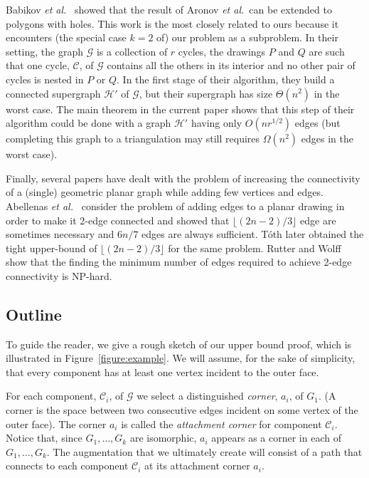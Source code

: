\documentclass[11pt]{patmorin}
\newcommand{\etal}{\emph{et al.}}
\begin{document}
Babikov \etal\ \cite{babikov.souvaine.ea:constructing} showed that the result of Aronov \etal\ can be extended to polygons with holes. This work is the most closely related to ours because it encounters (the special case $k=2$ of) our problem as a subproblem. In their setting, the graph $\mathcal G$ is a collection of $r$ cycles, the drawings $P$ and $Q$ are such that one cycle, $\mathcal C$, of $\mathcal G$ contains all the others in its interior and no other pair of cycles is nested in $P$ or $Q$. In the first stage of their algorithm, they build a connected supergraph $\mathcal{H}'$ of $\mathcal{G}$, but their supergraph has size $\Theta(n^2)$ in the worst case.  The main theorem in the current paper shows that this step of their algorithm could be done with a graph $\mathcal{H}'$ having only $O(nr^{1/2})$ edges (but completing this graph to a triangulation may still requires $\Omega(n^2)$ edges in the worst case).

Finally, several papers have dealt with the problem
of increasing the connectivity of a (single) geometric
planar graph while adding few vertices and edges.  Abellenas
\etal~\cite{abellanas.olaverri.ea:augmenting} consider the problem of
adding edges to a planar drawing in order to make it 2-edge connected
and showed that $\lfloor(2n-2)/3\rfloor$ edge are sometimes necessary
and $6n/7$ edges are always sufficient.  T\'oth \cite{toth:connectivity}
later obtained the tight upper-bound of $\lfloor(2n-2)/3\rfloor$ for
the same problem.  Rutter and Wolff \cite{rutter.wolff:augmenting} show
that the finding the minimum number of edges required to achieve 2-edge
connectivity is NP-hard.


\subsection{Outline}

To guide the reader, we give a rough sketch of our upper bound proof,
which is illustrated in Figure~\ref{figure:example}.  We will assume,
for the sake of simplicity, that every component has at least one vertex
incident to the outer face.

For each component, $\mathcal C_i$, of $\mathcal G$ we select
a distinguished \emph{corner}, $a_i$, of $G_1$. (A corner is the
space between two consecutive edges incident on some vertex of the
outer face). The corner $a_i$ is called the \emph{attachment corner}
for component $\mathcal C_i$.  Notice that, since $G_1,\ldots,G_k$
are isomorphic, $a_i$ appears as a corner in each of $G_1,\ldots,G_k$.
The augmentation that we ultimately create will consist of a path that
connects to each component $\mathcal C_i$ at its attachment corner $a_i$.
\end{document}
